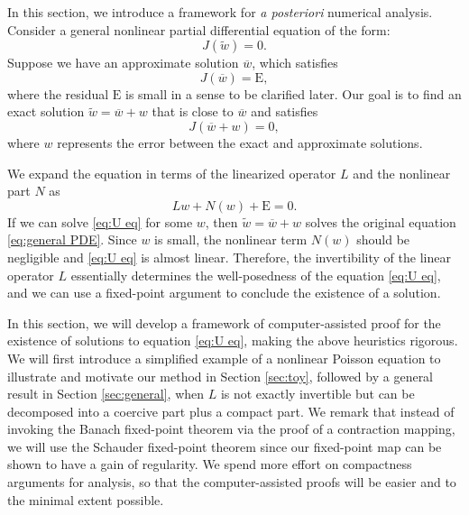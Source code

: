 \documentclass[11pt,a4paper]{article}
\numberwithin{equation}{section}
\newcommand{\Epsilon}{\mathrm{E}}
\newcommand{\assign}{:=}
\begin{document}
In this section, we introduce a framework for \textit{a posteriori} numerical analysis.
Consider a general nonlinear partial differential equation of the form:
\begin{equation}
  J (\widetilde{w}) = 0. \label{eq:general PDE}
\end{equation}
Suppose we have an approximate solution $\overline{w}$, which satisfies
\[ J (\overline{w}) = \Epsilon, \]
where the residual $\Epsilon$ is small in a sense to be clarified later. Our
goal is to find an exact solution $\widetilde{w} = \overline{w} + w$ that is close to $\overline{w}$ and
satisfies
\[ J (\overline{w} + w) = 0, \]
where $w$ represents the error between the exact and approximate solutions.

We expand the equation in terms of the linearized operator $L$ and the nonlinear part $N$ as
\begin{equation}
  L w + N (w) + \Epsilon = 0. \label{eq:U eq}
\end{equation}
If we can solve \eqref{eq:U eq} for some $w$, then $\widetilde{w} = \overline{w} +
w$ solves  the original equation \eqref{eq:general PDE}. Since $w$ is small,
the nonlinear term $N (w)$ should be negligible and \eqref{eq:U eq} is almost
linear. Therefore, the invertibility of the linear operator $L$ essentially
determines the well-posedness of the equation \eqref{eq:U eq}, and we can use a fixed-point argument to conclude the existence of a solution. 

In this section, we will develop a framework of computer-assisted proof for
the existence of solutions to equation  \eqref{eq:U eq}, making the above heuristics rigorous. We will first
introduce a simplified example of a nonlinear Poisson equation to illustrate and motivate our method in Section
\ref{sec:toy}, followed by a general result in Section \ref{sec:general}, when $L$ is not exactly invertible but can be decomposed into a coercive part plus a compact part. We remark that instead of invoking the Banach fixed-point theorem via the proof of a contraction mapping, we will use the Schauder fixed-point theorem since our fixed-point map can be shown to have a gain of regularity. We spend more effort on compactness arguments for analysis, so that the computer-assisted proofs will be easier and to the minimal extent possible.  
\end{document}
